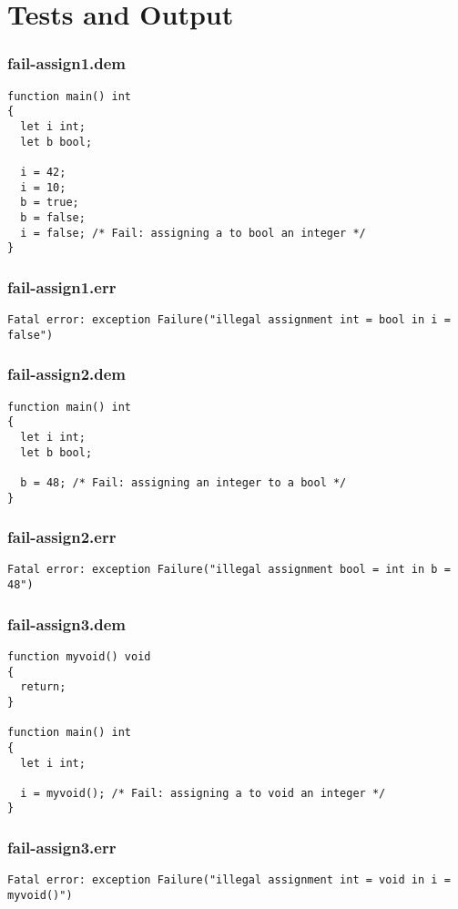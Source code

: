 \chapter{Tests and Output}
\subsection{fail-assign1.dem}
\begin{lstlisting}
function main() int
{
  let i int;
  let b bool;

  i = 42;
  i = 10;
  b = true;
  b = false;
  i = false; /* Fail: assigning a to bool an integer */
}
\end{lstlisting}
\subsection{fail-assign1.err}
\begin{lstlisting}
Fatal error: exception Failure("illegal assignment int = bool in i = false")
\end{lstlisting}
\subsection{fail-assign2.dem}
\begin{lstlisting}
function main() int
{
  let i int;
  let b bool;

  b = 48; /* Fail: assigning an integer to a bool */
}
\end{lstlisting}
\subsection{fail-assign2.err}
\begin{lstlisting}
Fatal error: exception Failure("illegal assignment bool = int in b = 48")
\end{lstlisting}
\subsection{fail-assign3.dem}
\begin{lstlisting}
function myvoid() void
{
  return;
}

function main() int
{
  let i int;

  i = myvoid(); /* Fail: assigning a to void an integer */
}
\end{lstlisting}
\subsection{fail-assign3.err}
\begin{lstlisting}
Fatal error: exception Failure("illegal assignment int = void in i = myvoid()")
\end{lstlisting}

